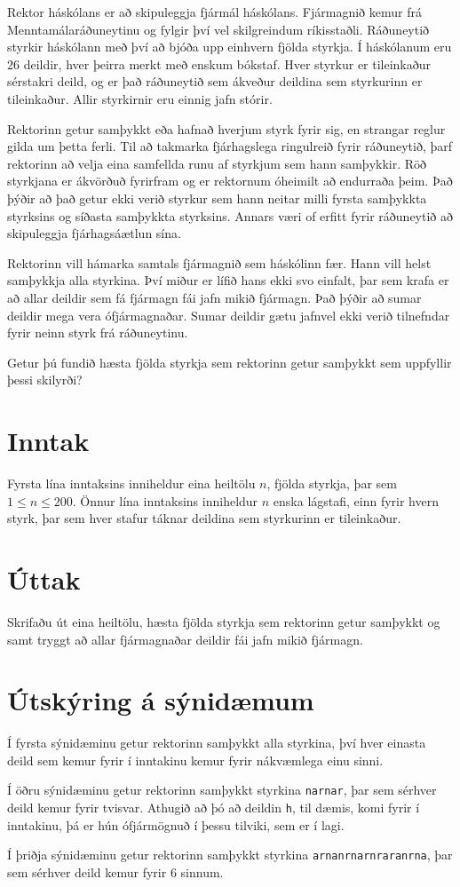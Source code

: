 
Rektor háskólans er að skipuleggja fjármál háskólans.
Fjármagnið kemur frá Menntamálaráðuneytinu og fylgir því vel skilgreindum ríkisstaðli.
Ráðuneytið styrkir háskólann með því að bjóða upp einhvern fjölda styrkja.
Í háskólanum eru $26$ deildir, hver þeirra merkt með enskum bókstaf.
Hver styrkur er tileinkaður sérstakri deild, og er það ráðuneytið sem ákveður deildina sem styrkurinn er tileinkaður.
Allir styrkirnir eru einnig jafn stórir.

Rektorinn getur samþykkt eða hafnað hverjum styrk fyrir sig, en strangar reglur gilda um þetta ferli.
Til að takmarka fjárhagslega ringulreið fyrir ráðuneytið, þarf rektorinn að velja eina samfellda runu af styrkjum sem hann samþykkir.
Röð styrkjana er ákvörðuð fyrirfram og er rektornum óheimilt að endurraða þeim.
Það þýðir að það getur ekki verið styrkur sem hann neitar milli fyrsta samþykkta styrksins og síðasta samþykkta styrksins.
Annars væri of erfitt fyrir ráðuneytið að skipuleggja fjárhagsáætlun sína.

Rektorinn vill hámarka samtals fjármagnið sem háskólinn fær.
Hann vill helst samþykkja alla styrkina.
Því miður er lífið hans ekki svo einfalt, þar sem krafa er að allar deildir sem fá fjármagn fái jafn mikið fjármagn.
Það þýðir að sumar deildir mega vera ófjármagnaðar.
Sumar deildir gætu jafnvel ekki verið tilnefndar fyrir neinn styrk frá ráðuneytinu.

Getur þú fundið hæsta fjölda styrkja sem rektorinn getur samþykkt sem uppfyllir þessi skilyrði?

\section*{Inntak}
Fyrsta lína inntaksins inniheldur eina heiltölu $n$, fjölda styrkja, þar sem $1 \leq n \leq 200$.
Önnur lína inntaksins inniheldur $n$ enska lágstafi, einn fyrir hvern styrk, þar sem hver stafur táknar deildina sem styrkurinn er tileinkaður.

\section*{Úttak}
Skrifaðu út eina heiltölu, hæsta fjölda styrkja sem rektorinn getur samþykkt og samt tryggt að allar fjármagnaðar deildir fái jafn mikið fjármagn.

\section*{Útskýring á sýnidæmum}
Í fyrsta sýnidæminu getur rektorinn samþykkt alla styrkina, því hver einasta deild sem kemur fyrir í inntakinu kemur fyrir nákvæmlega einu sinni.

Í öðru sýnidæminu getur rektorinn samþykkt styrkina \texttt{narnar}, þar sem sérhver deild kemur fyrir tvisvar. Athugið að þó að deildin \texttt{h}, til dæmis, komi fyrir í inntakinu, þá er hún ófjármögnuð í þessu tilviki, sem er í lagi.

Í þriðja sýnidæminu getur rektorinn samþykkt styrkina \texttt{arnanrnarnraranrna}, þar sem sérhver deild kemur fyrir $6$ sinnum.
